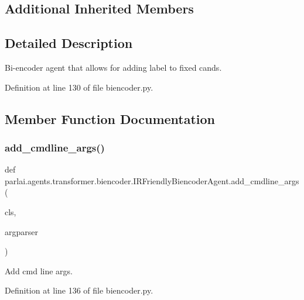 \subsection*{Additional Inherited Members}


\subsection{Detailed Description}
\begin{DoxyVerb}Bi-encoder agent that allows for adding label to fixed cands.
\end{DoxyVerb}
 

Definition at line 130 of file biencoder.\+py.



\subsection{Member Function Documentation}
\mbox{\label{classparlai_1_1agents_1_1transformer_1_1biencoder_1_1IRFriendlyBiencoderAgent_a8ad3444ddd1002990ce5472fa1ec72bf}} 
\subsubsection{\texorpdfstring{add\+\_\+cmdline\+\_\+args()}{add\_cmdline\_args()}}
{\footnotesize\ttfamily def parlai.\+agents.\+transformer.\+biencoder.\+I\+R\+Friendly\+Biencoder\+Agent.\+add\+\_\+cmdline\+\_\+args (\begin{DoxyParamCaption}\item[{}]{cls,  }\item[{}]{argparser }\end{DoxyParamCaption})}

\begin{DoxyVerb}Add cmd line args.
\end{DoxyVerb}
 

Definition at line 136 of file biencoder.\+py.


